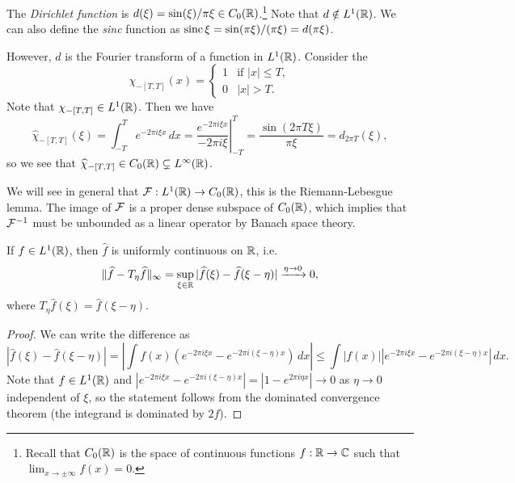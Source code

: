 \begin{example}
  The \emph{Dirichlet function}
  is $d(\xi) = \sin(\xi) / \pi \xi \in C_0(\mathbb{R})$.\footnote{Recall that $C_0(\mathbb{R})$ is the space of continuous functions $f : \mathbb{R} \to \mathbb{C}$ such that $\lim_{x \to \pm \infty} f(x) = 0$.}
  Note that $d \notin L^1(\mathbb{R})$.
  We can also define the
  \emph{sinc} function as
  $\operatorname{sinc} \xi = \sin(\pi \xi) / (\pi \xi) = d(\pi \xi)$.

  However, $d$ is the Fourier transform
  of a function in $L^1(\mathbb{R})$.
  Consider the
  \[
    \chi_{-[T, T]}(x) =
    \begin{cases}
      1 & \text{if } |x| \le T, \\
      0 & |x| > T.
    \end{cases}
  \]
  Note that $\chi_{-[T, T]} \in L^1(\mathbb{R})$.
  Then we have
  \[
    \widehat{\chi}_{-[T, T]}(\xi)
    = \int_{-T}^{T} e^{-2\pi i \xi x}\, dx
    = \left.\frac{e^{-2\pi i \xi x}}{-2\pi i \xi}\right|_{-T}^T
    = \frac{\sin(2\pi T \xi)}{\pi \xi}
    = d_{2\pi T}(\xi),
  \]
  so we see that
  $\widehat{\chi}_{-[T, T]} \in C_0(\mathbb{R}) \subsetneq L^\infty(\mathbb{R})$.
\end{example}

\begin{remark}
  We will see in general that
  $\mathcal{F} : L^1(\mathbb{R}) \to C_0(\mathbb{R})$,
  this is the Riemann-Lebesgue lemma.
  The image of $\mathcal{F}$ is a proper
  dense subspace of $C_0(\mathbb{R})$, which
  implies that $\mathcal{F}^{-1}$ must be unbounded
  as a linear operator by Banach space
  theory.
\end{remark}

\begin{prop}
  If $f \in L^1(\mathbb{R})$, then $\widehat{f}$
  is uniformly continuous on $\mathbb{R}$, i.e.
  \[
    \|\widehat{f} - T_\eta\widehat{f}\|_\infty
    = \sup_{\xi \in \mathbb{R}} |\widehat{f}(\xi) - \widehat{f}(\xi - \eta)|
    \xrightarrow{\eta \to 0} 0,
  \]
  where $T_\eta \widehat{f}(\xi) = \widehat{f}(\xi - \eta)$.
\end{prop}

\begin{proof}
  We can write the difference as
  \[
    |\widehat{f}(\xi) - \widehat{f}(\xi - \eta)|
    = \left|\int f(x) (e^{-2\pi i \xi x} - e^{-2\pi i (\xi - \eta)x})\, dx\right|
    \le \int |f(x)| |e^{-2\pi i \xi x} - e^{-2\pi i (\xi - \eta)x}|\, dx.
  \]
  Note that $f \in L^1(\mathbb{R})$ and
  $|e^{-2\pi i \xi x} - e^{-2\pi i (\xi - \eta)x}| = |1 - e^{2\pi i \eta x}| \to 0$
  as $\eta \to 0$
  independent of $\xi$, so the statement
  follows from the dominated convergence
  theorem (the integrand is dominated
  by $2f$).
\end{proof}

